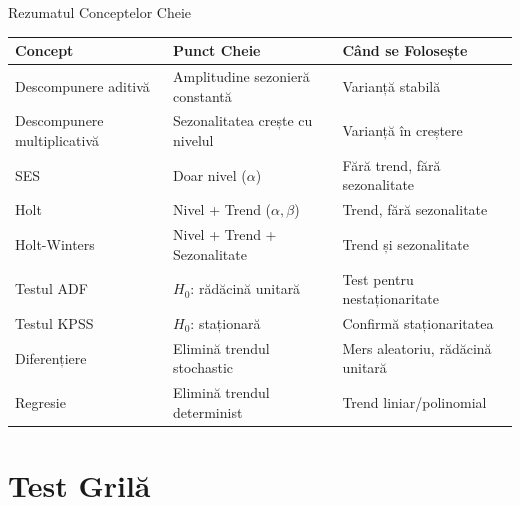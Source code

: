 \documentclass[9pt, aspectratio=169, t]{beamer}
\begin{document}
\begin{frame}{Rezumatul Conceptelor Cheie}
    \begin{center}
    \small
    \begin{tabular}{lll}
        \toprule
        \textbf{Concept} & \textbf{Punct Cheie} & \textbf{Când se Folosește} \\
        \midrule
        Descompunere aditivă & Amplitudine sezonieră constantă & Varianță stabilă \\
        Descompunere multiplicativă & Sezonalitatea crește cu nivelul & Varianță în creștere \\
        SES & Doar nivel ($\alpha$) & Fără trend, fără sezonalitate \\
        Holt & Nivel + Trend ($\alpha, \beta$) & Trend, fără sezonalitate \\
        Holt-Winters & Nivel + Trend + Sezonalitate & Trend și sezonalitate \\
        \midrule
        Testul ADF & $H_0$: rădăcină unitară & Test pentru nestaționaritate \\
        Testul KPSS & $H_0$: staționară & Confirmă staționaritatea \\
        \midrule
        Diferențiere & Elimină trendul stochastic & Mers aleatoriu, rădăcină unitară \\
        Regresie & Elimină trendul determinist & Trend liniar/polinomial \\
        \bottomrule
    \end{tabular}
    \end{center}
\end{frame}

\section{Test Grilă}
\end{document}
